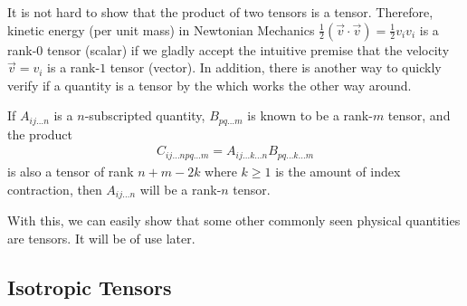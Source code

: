 It is not hard to show that the product of two tensors is a tensor.\footnotemark{} Therefore, kinetic energy (per unit mass) in Newtonian Mechanics $\frac{1}{2}(\vec{v} \cdot \vec{v}) = \frac{1}{2}v_iv_i$ is a rank-$0$ tensor (scalar) if we gladly accept the intuitive premise that the velocity $\vec{v} = v_i$ is a rank-$1$ tensor (vector). In addition, there is another way to quickly verify if a quantity is a tensor by the  which works the other way around.
\begin{thm}
\label{thm:quotientl}
If $A_{ij\ldots n}$ is a $n$-subscripted quantity, $B_{pq\ldots m}$ is known to be a rank-$m$ tensor, and the product
\begin{align*}
C_{ij\ldots npq \ldots m} = A_{ij\ldots k\ldots n} B_{pq\ldots k\ldots m}   
\end{align*}
is also a tensor of rank $n+m-2k$ where $k \geq 1$ is the amount of index contraction, then $A_{ij\ldots n}$ will be a rank-$n$ tensor.
\end{thm}
With this, we can easily show that some other commonly seen physical quantities are tensors. It will be of use later. 

\subsection{Isotropic Tensors}

